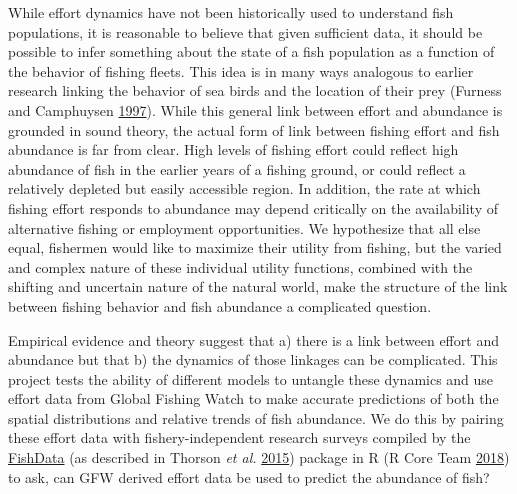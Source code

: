 \documentclass[twoside,12pt,final]{ucthesis-CA2012}
\begin{document}
\begin{ucmainmatter}
While effort dynamics have not been historically used to understand fish
populations, it is reasonable to believe that given sufficient data, it
should be possible to infer something about the state of a fish
population as a function of the behavior of fishing fleets. This idea is
in many ways analogous to earlier research linking the behavior of sea
birds and the location of their prey (Furness and Camphuysen
\protect\hyperlink{ref-Furness1997}{1997}). While this general link
between effort and abundance is grounded in sound theory, the actual
form of link between fishing effort and fish abundance is far from
clear. High levels of fishing effort could reflect high abundance of
fish in the earlier years of a fishing ground, or could reflect a
relatively depleted but easily accessible region. In addition, the rate
at which fishing effort responds to abundance may depend critically on
the availability of alternative fishing or employment opportunities. We
hypothesize that all else equal, fishermen would like to maximize their
utility from fishing, but the varied and complex nature of these
individual utility functions, combined with the shifting and uncertain
nature of the natural world, make the structure of the link between
fishing behavior and fish abundance a complicated question.

Empirical evidence and theory suggest that a) there is a link between
effort and abundance but that b) the dynamics of those linkages can be
complicated. This project tests the ability of different models to
untangle these dynamics and use effort data from Global Fishing Watch to
make accurate predictions of both the spatial distributions and relative
trends of fish abundance. We do this by pairing these effort data with
fishery-independent research surveys compiled by the
\href{https://github.com/James-Thorson/FishData}{FishData} (as described
in Thorson \emph{et al.} \protect\hyperlink{ref-Thorson2015a}{2015})
package in R (R Core Team \protect\hyperlink{ref-RCoreTeam2018}{2018})
to ask, can GFW derived effort data be used to predict the abundance of
fish?


\end{ucmainmatter}
\end{document}
